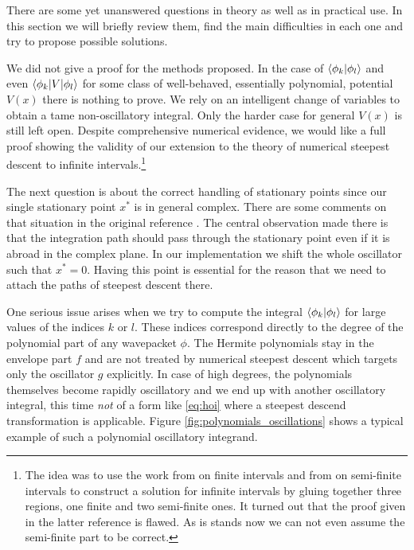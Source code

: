 \documentclass[a4paper,10pt]{article}
\begin{document}
There are some yet unanswered questions in theory as well as in practical use.
In this section we will briefly review them, find the main difficulties
in each one and try to propose possible solutions.

We did not give a proof for the methods proposed.
In the case of $\braket{\phi_k | \phi_l}$ and even $\braket{\phi_k | V | \phi_l}$
for some class of well-behaved, essentially polynomial, potential $V(x)$ there is
nothing to prove. We rely on an intelligent change of variables to obtain a tame
non-oscillatory integral. Only the harder case for general $V(x)$ is still left open.
Despite comprehensive numerical evidence, we would like a full proof showing the
validity of our extension to the theory of numerical steepest descent to infinite
intervals.\footnote{The idea was to use the work from \cite{HV_hoq}
on finite intervals and from \cite{H_nsd_sii} on semi-finite intervals
to construct a solution for infinite intervals by gluing together three regions,
one finite and two semi-finite ones. It turned out that the proof
given in the latter reference is flawed. As is stands now we can not even assume
the semi-finite part to be correct.}

The next question is about the correct handling of stationary points since our
single stationary point $x^{*}$ is in general complex. There are some comments on
that situation in the original reference \cite{HV_hoq}. The central observation made
there is that the integration path should pass through the stationary point even if
it is abroad in the complex plane. In our implementation we shift the whole oscillator
such that $x^{*} = 0$. Having this point is essential for the reason that we need to
attach the paths of steepest descent there.

One serious issue arises when we try to compute the integral $\braket{\phi_k|\phi_l}$
for large values of the indices $k$ or $l$. These indices correspond directly to the
degree of the polynomial part of any wavepacket $\phi$. The Hermite polynomials
stay in the envelope part $f$ and are not treated by numerical steepest descent which
targets only the oscillator $g$ explicitly. In case of high degrees, the polynomials
themselves become rapidly oscillatory and we end up with another oscillatory integral,
this time \emph{not} of a form like \eqref{eq:hoi} where a steepest descend transformation
is applicable. Figure \ref{fig:polynomials_oscillations} shows a typical example of
such a polynomial oscillatory integrand.
\end{document}
